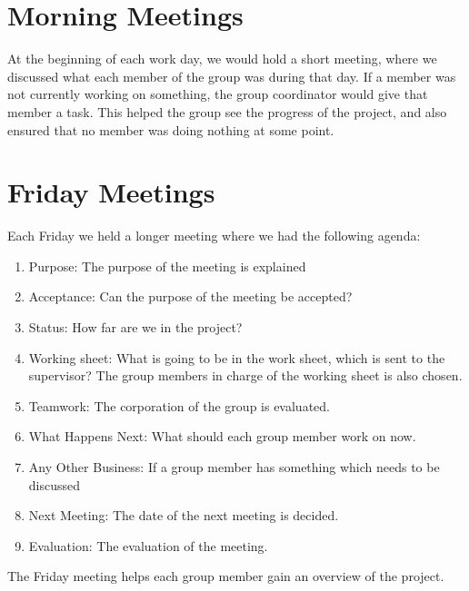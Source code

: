 \section{Morning Meetings}
At the beginning of each work day, we would hold a short meeting, where we discussed what each member of the group was during that day. If a member was not currently working on something, the group coordinator would give that member a task. This helped the group see the progress of the project, and also ensured that no member was doing nothing at some point.

\section{Friday Meetings}
Each Friday we held a longer meeting where we had the following agenda:

\begin{enumerate}
	\item Purpose: The purpose of the meeting is explained
	\item Acceptance: Can the purpose of the meeting be accepted? 
	\item Status: How far are we in the project?
	\item Working sheet: What is going to be in the work sheet, which is sent to the supervisor? The group members in charge of the working sheet is also chosen. 
	\item Teamwork: The corporation of the group is evaluated.  
	\item What Happens Next: What should each group member work on now.
	\item Any Other Business: If a group member has something which needs to be discussed
	\item Next Meeting: The date of the next meeting is decided. 
	\item Evaluation: The evaluation of the meeting. 
\end{enumerate}

The Friday meeting helps each group member gain an overview of the project.